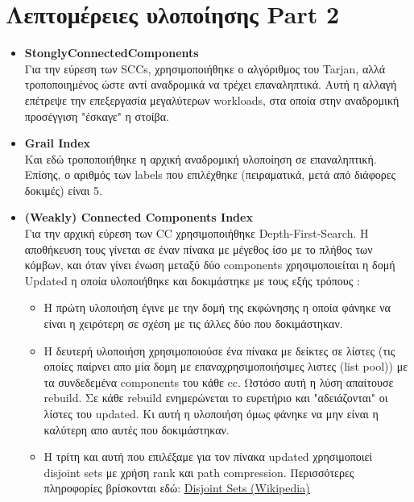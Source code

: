 \documentclass[12pt]{article}
\begin{document}
\section{Λεπτομέρειες υλοποίησης Part 2}
\begin{itemize}
\item \textbf{StonglyConnectedComponents}\\
Για την εύρεση των SCCs, χρησιμοποιήθηκε ο αλγόριθμος του Tarjan, αλλά τροποποιημένος ώστε αντί αναδρομικά να τρέχει επαναληπτικά. Αυτή η αλλαγή επέτρεψε την επεξεργασία μεγαλύτερων workloads, στα οποία στην αναδρομική προσέγγιση "έσκαγε" η στοίβα.
\item \textbf{Grail Index}\\
Και εδώ τροποποιήθηκε η αρχική αναδρομική υλοποίηση σε επαναληπτική. Επίσης, ο αριθμός των labels που επιλέχθηκε (πειραματικά, μετά από διάφορες δοκιμές) είναι 5.
\item \textbf{(Weakly) Connected Components Index}\\
Για την αρχική εύρεση των CC χρησιμοποιήθηκε Depth-First-Search. Η αποθήκευση τους γίνεται σε έναν πίνακα με μέγεθος ίσο με το πλήθος των κόμβων, και όταν γίνει ένωση μεταξύ δύο components χρησιμοποιείται η δομή Updated η οποία υλοποιήθηκε και δοκιμάστηκε με τους εξής τρόπους :
\begin{itemize}
\item H πρώτη υλοποιήση έγινε με την δομή της εκφώνησης η οποία φάνηκε να είναι η χειρότερη σε σχέση με τις άλλες δύο που δοκιμάστηκαν.
\item Η δευτερή υλοποιήση χρησιμοποιούσε ένα πίνακα με δείκτες σε λίστες (τις οποίες παίρνει απο μία δομη με επαναχρησιμοποιήσιμες λιστες (list pool)) με τα συνδεδεμένα components του κάθε cc. Ωστόσο αυτή η λύση απαίτουσε rebuild. Σε κάθε rebuild ενημερώνεται το ευρετήριο και "αδειάζονται" οι λίστες του updated. Κι αυτή η υλοποιήση όμως φάνηκε να μην είναι η καλύτερη απο αυτές που δοκιμάστηκαν.
\item Η τρίτη και αυτή που επιλέξαμε για τον πίνακα updated χρησιμοποιεί disjoint sets με χρήση rank και path compression. Περισσότερες πληροφορίες βρίσκονται εδώ: {\color{blue}\underline{\href{https://en.wikipedia.org/wiki/Disjoint-set\_data\_structure\#Union\_by\_rank}{Disjoint Sets (Wikipedia)}}}
\end{itemize}
\end{itemize}
\end{document}
